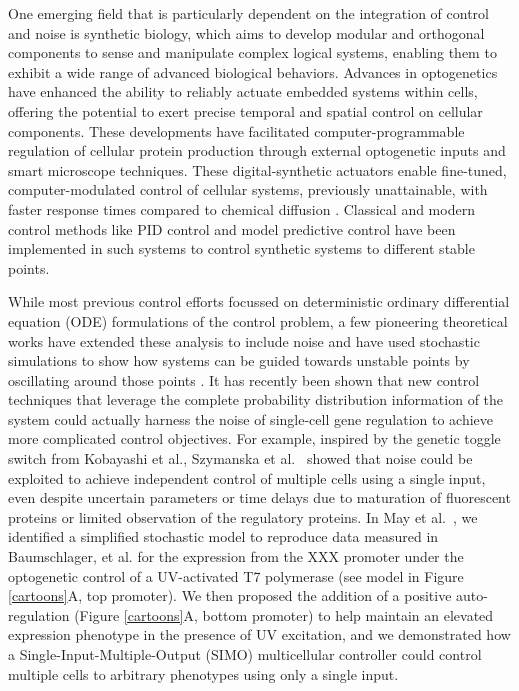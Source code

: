 \documentclass[12pt]{iopart}
\begin{document}
One emerging field that is particularly dependent on the integration of control and noise is synthetic biology, which aims to develop modular\cite{Ng2019} and orthogonal \cite{Liu2018} components to sense and manipulate \cite{Sheets2020} complex logical systems, enabling them to exhibit a wide range of advanced biological behaviors\cite{Shin2020}. 
Advances in optogenetics have enhanced the ability to reliably actuate embedded systems within cells, offering the potential to exert precise temporal and spatial control on cellular components\cite{Sheets2020,Baumschlager2017,Chen2020,Lillacci2018}.
These developments have facilitated computer-programmable regulation of cellular protein production through external optogenetic inputs and smart microscope techniques\cite{Fox2021,Baumschlager2021,Lugagne2017}. 
These digital-synthetic actuators enable fine-tuned, computer-modulated control of cellular systems, previously unattainable, with faster response times compared to chemical diffusion\cite{Rullan2018, Baumschlager2017} . 
Classical and modern control methods like PID control and model predictive control have been implemented in such systems\cite{} to control synthetic systems to different stable points. 

While most previous control efforts focussed on deterministic ordinary differential equation (ODE) formulations of the control problem, a few pioneering theoretical works have extended these analysis to include noise and have used stochastic simulations to show how systems can be guided towards unstable points by oscillating around those points \cite{Guarino2020}. 
It has recently been shown that new control techniques that leverage the complete probability distribution information of the system could actually harness the noise of single-cell gene regulation to achieve more complicated control objectives. 
For example, inspired by the genetic toggle switch from Kobayashi et al.\cite{Kobayashi:2004}, Szymanska et al.~\cite{Szymanska2015} showed that noise could be exploited to achieve independent control of multiple cells using a single input, even despite uncertain parameters or time delays due to maturation of fluorescent proteins or limited observation of the regulatory proteins. 
In May et al.~\cite{May2021}, we identified a simplified stochastic model to reproduce data measured in Baumschlager, et al.\cite{XXX} for the expression from the XXX promoter under the optogenetic control of a UV-activated T7 polymerase (see model in Figure \ref{cartoons}A, top promoter).
We then proposed the addition of a positive auto-regulation (Figure \ref{cartoons}A, bottom promoter) to help maintain an elevated expression phenotype in the presence of UV excitation, and we demonstrated how a Single-Input-Multiple-Output (SIMO) multicellular controller could control multiple cells to arbitrary phenotypes using only a single input. 
\end{document}
